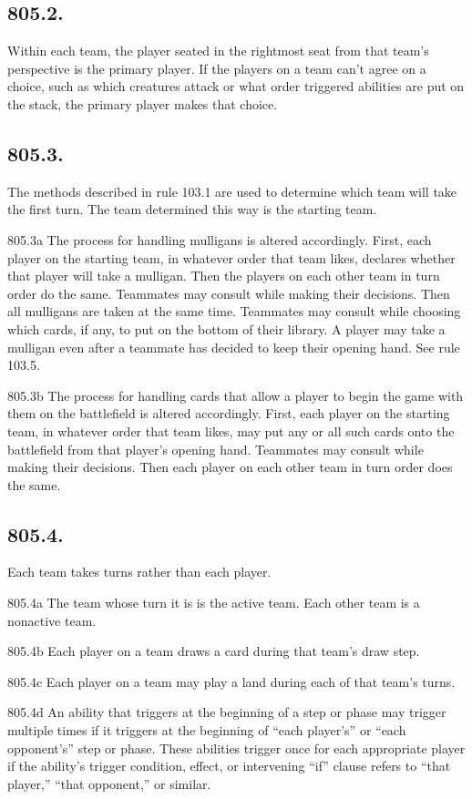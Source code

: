 \subsection*{805.2.}
Within each team, the player seated in the rightmost seat from that team’s perspective is the primary player. If the players on a team can’t agree on a choice, such as which creatures attack or what order triggered abilities are put on the stack, the primary player makes that choice.

\subsection*{805.3.}
The methods described in rule 103.1 are used to determine which team will take the first turn. The team determined this way is the starting team.

805.3a The process for handling mulligans is altered accordingly. First, each player on the starting team, in whatever order that team likes, declares whether that player will take a mulligan. Then the players on each other team in turn order do the same. Teammates may consult while making their decisions. Then all mulligans are taken at the same time. Teammates may consult while choosing which cards, if any, to put on the bottom of their library. A player may take a mulligan even after a teammate has decided to keep their opening hand. See rule 103.5.

805.3b The process for handling cards that allow a player to begin the game with them on the battlefield is altered accordingly. First, each player on the starting team, in whatever order that team likes, may put any or all such cards onto the battlefield from that player’s opening hand. Teammates may consult while making their decisions. Then each player on each other team in turn order does the same.

\subsection*{805.4.}
Each team takes turns rather than each player.

805.4a The team whose turn it is is the active team. Each other team is a nonactive team.

805.4b Each player on a team draws a card during that team’s draw step.

805.4c Each player on a team may play a land during each of that team’s turns.

805.4d An ability that triggers at the beginning of a step or phase may trigger multiple times if it triggers at the beginning of “each player’s” or “each opponent’s” step or phase. These abilities trigger once for each appropriate player if the ability’s trigger condition, effect, or intervening “if” clause refers to “that player,” “that opponent,” or similar.

